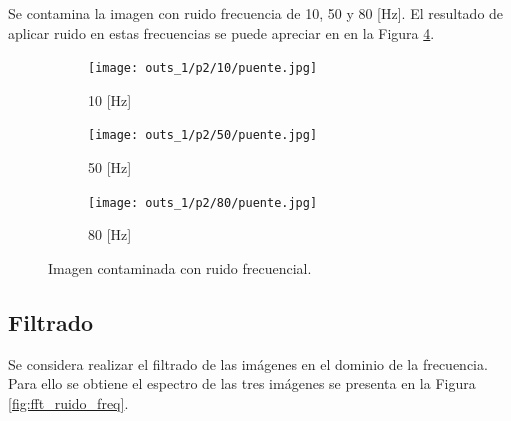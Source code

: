 \documentclass[
  letterpaper,
  twocolumn,
  9pt,
  journal,
  final]{IEEEtran}
\begin{document}
Se contamina la imagen con ruido frecuencia de 10, 50 y 80 [Hz]. El resultado de aplicar ruido en estas frecuencias se puede apreciar en en la Figura \ref{fig:puente_ruido}.

\begin{figure}[!tbh]
  \centering
  \begin{subfigure}[b]{.31\linewidth}
    \texttt{[image: outs\_1/p2/10/puente.jpg]}
    \caption{10 [Hz]}\label{fig:hz10}
  \end{subfigure}
  \begin{subfigure}[b]{.31\linewidth}
    \texttt{[image: outs\_1/p2/50/puente.jpg]}
    \caption{50 [Hz]}\label{fig:hz50}
  \end{subfigure}
  \begin{subfigure}[b]{.31\linewidth}
    \texttt{[image: outs\_1/p2/80/puente.jpg]}
    \caption{80 [Hz]}\label{fig:hz80}
  \end{subfigure}
  \caption{Imagen contaminada con ruido frecuencial.}
  \label{fig:puente_ruido}
\end{figure}

\subsection{Filtrado}

Se considera realizar el filtrado de las imágenes en el dominio de la frecuencia. Para ello se obtiene el espectro de las tres imágenes se presenta en la Figura \ref{fig:fft_ruido_freq}.
\end{document}
